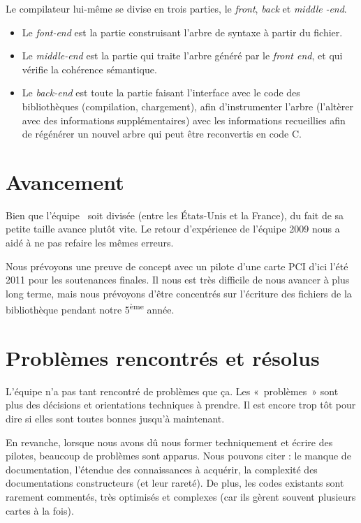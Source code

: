 \documentclass[francais]{rtxreport}
\begin{document}
Le compilateur lui-même se divise en trois parties, le \emph{front}, \emph{back}
et \emph{middle} \emph{-end}.

\begin{itemize}
	\item Le \emph{font-end} est la partie construisant l’arbre de syntaxe à
          partir du fichier.
	\item Le \emph{middle-end} est la partie qui traite l’arbre généré par
          le \emph{front end}, et qui vérifie la cohérence sémantique.
	\item Le \emph{back-end} est toute la partie faisant l’interface avec le
          code des bibliothèques (compilation, chargement), afin d'instrumenter
          l'arbre (l’altèrer avec des informations supplémentaires) avec les
          informations recueillies afin de régénérer un nouvel arbre qui peut
          être reconvertis en code C.
\end{itemize}

\section{Avancement}

Bien que l'équipe \rtx\ soit divisée (entre les États-Unis et la France), du
fait de sa petite taille avance plutôt vite. Le retour d'expérience de l'équipe
2009 nous a aidé à ne pas refaire les mêmes erreurs.

Nous prévoyons une preuve de concept avec un pilote d’une carte PCI d’ici l'été
2011 pour les soutenances finales. Il nous est très difficile de nous avancer à
plus long terme, mais nous prévoyons d’être concentrés sur l’écriture des
fichiers de la bibliothèque pendant notre 5\textsuperscript{ème} année.

\section{Problèmes rencontrés et résolus}

L’équipe n’a pas tant rencontré de problèmes que ça. Les «~problèmes~» sont plus
des décisions et orientations techniques à prendre. Il est encore trop tôt pour
dire si elles sont toutes bonnes jusqu’à maintenant.

En revanche, lorsque nous avons dû nous former techniquement et écrire des
pilotes, beaucoup de problèmes sont apparus. Nous pouvons citer : le manque de
documentation, l’étendue des connaissances à acquérir, la complexité des
documentations constructeurs (et leur rareté). De plus, les codes existants sont
rarement commentés, très optimisés et complexes (car ils gèrent souvent
plusieurs cartes à la fois).
\end{document}
